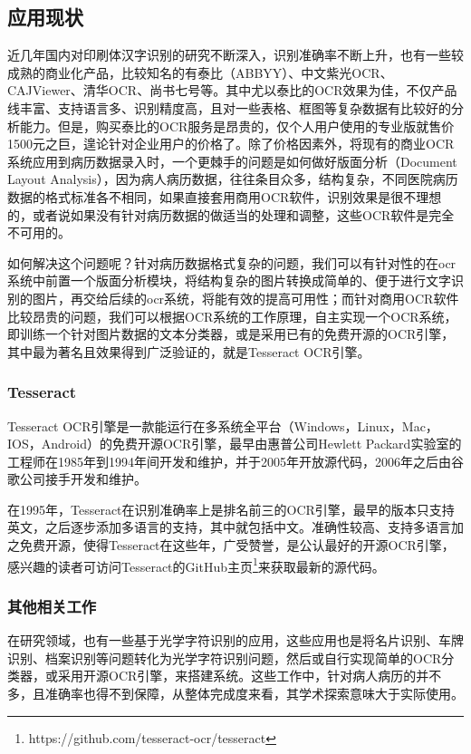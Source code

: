 \subsection{应用现状}
近几年国内对印刷体汉字识别的研究不断深入，识别准确率不断上升，也有一些较成熟的商业化产品，比较知名的有泰比（ABBYY）、中文紫光OCR、CAJViewer、清华OCR、尚书七号等。其中尤以泰比的OCR效果为佳，不仅产品线丰富、支持语言多、识别精度高，且对一些表格、框图等复杂数据有比较好的分析能力。但是，购买泰比的OCR服务是昂贵的，仅个人用户使用的专业版就售价1500元之巨，遑论针对企业用户的价格了。除了价格因素外，将现有的商业OCR系统应用到病历数据录入时，一个更棘手的问题是如何做好版面分析（Document Layout Analysis），因为病人病历数据，往往条目众多，结构复杂，不同医院病历数据的格式标准各不相同，如果直接套用商用OCR软件，识别效果是很不理想的，或者说如果没有针对病历数据的做适当的处理和调整，这些OCR软件是完全不可用的。

如何解决这个问题呢？针对病历数据格式复杂的问题，我们可以有针对性的在ocr系统中前置一个版面分析模块，将结构复杂的图片转换成简单的、便于进行文字识别的图片，再交给后续的ocr系统，将能有效的提高可用性；而针对商用OCR软件比较昂贵的问题，我们可以根据OCR系统的工作原理，自主实现一个OCR系统，即训练一个针对图片数据的文本分类器，或是采用已有的免费开源的OCR引擎，其中最为著名且效果得到广泛验证的，就是Tesseract OCR引擎。

\subsubsection*{Tesseract}
Tesseract OCR引擎是一款能运行在多系统全平台（Windows，Linux，Mac，IOS，Android）的免费开源OCR引擎，最早由惠普公司Hewlett Packard实验室的工程师在1985年到1994年间开发和维护，并于2005年开放源代码，2006年之后由谷歌公司接手开发和维护\citep{wiki:Tesseract}。

在1995年，Tesseract在识别准确率上是排名前三的OCR引擎，最早的版本只支持英文，之后逐步添加多语言的支持，其中就包括中文。准确性较高、支持多语言加之免费开源，使得Tesseract在这些年，广受赞誉，是公认最好的开源OCR引擎，感兴趣的读者可访问Tesseract的GitHub主页\footnote{https://github.com/tesseract-ocr/tesseract}来获取最新的源代码。

\subsubsection*{其他相关工作}
在研究领域，也有一些基于光学字符识别的应用\citep{SongWan, HongfengLi, TikunHu}，这些应用也是将名片识别、车牌识别、档案识别等问题转化为光学字符识别问题，然后或自行实现简单的OCR分类器，或采用开源OCR引擎，来搭建系统。这些工作中，针对病人病历的并不多\citep{MinghuaXiang}，且准确率也得不到保障，从整体完成度来看，其学术探索意味大于实际使用。

